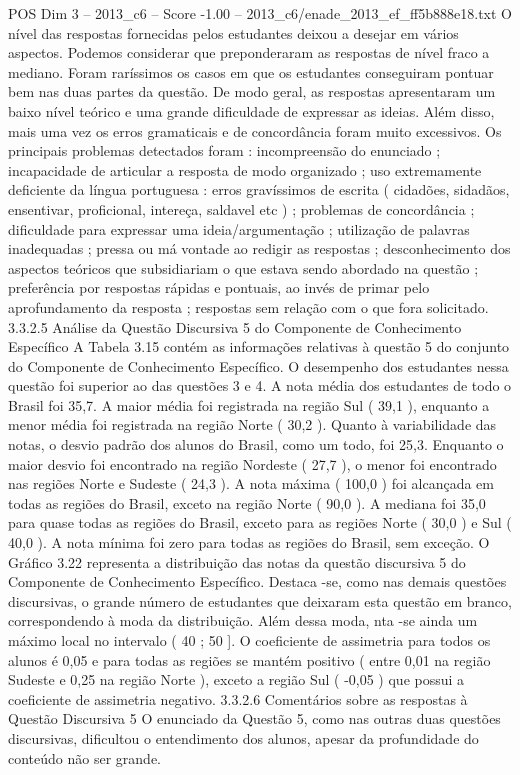 \begin{textsample}{POS Dim 3 – 2013\_c6 – Score -1.00 – 2013\_c6/enade\_2013\_ef\_ff5b888e18.txt}
O nível das respostas fornecidas pelos estudantes deixou a desejar em vários aspectos.
Podemos considerar que preponderaram as respostas de nível fraco a mediano.
Foram raríssimos os casos em que os estudantes conseguiram pontuar bem nas duas partes da questão.
De modo geral, as respostas apresentaram um baixo nível teórico e uma grande dificuldade de expressar as ideias.
Além disso, mais uma vez os erros gramaticais e de concordância foram muito excessivos.
Os principais problemas detectados foram : incompreensão do enunciado ; incapacidade de articular a resposta de modo organizado ; uso extremamente deficiente da língua portuguesa : erros gravíssimos de escrita ( cidadões, sidadãos, ensentivar, proficional, intereça, saldavel etc ) ; problemas de concordância ; dificuldade para expressar uma ideia/argumentação ; utilização de palavras inadequadas ; pressa ou má vontade ao redigir as respostas ; desconhecimento dos aspectos teóricos que subsidiariam o que estava sendo abordado na questão ; preferência por respostas rápidas e pontuais, ao invés de primar pelo aprofundamento da resposta ; respostas sem relação com o que fora solicitado. 3.3.2.5 Análise da Questão Discursiva 5 do Componente de Conhecimento Específico A Tabela 3.15 contém as informações relativas à questão 5 do conjunto do Componente de Conhecimento Específico.
O desempenho dos estudantes nessa questão foi superior ao das questões 3 e 4.
A nota média dos estudantes de todo o Brasil foi 35,7.
A maior média foi registrada na região Sul ( 39,1 ), enquanto a menor média foi registrada na região Norte ( 30,2 ).
Quanto à variabilidade das notas, o desvio padrão dos alunos do Brasil, como um todo, foi 25,3.
Enquanto o maior desvio foi encontrado na região Nordeste ( 27,7 ), o menor foi encontrado nas regiões Norte e Sudeste ( 24,3 ).
A nota máxima ( 100,0 ) foi alcançada em todas as regiões do Brasil, exceto na região Norte ( 90,0 ).
A mediana foi 35,0 para quase todas as regiões do Brasil, exceto para as regiões Norte ( 30,0 ) e Sul ( 40,0 ).
A nota mínima foi zero para todas as regiões do Brasil, sem exceção.
O Gráfico 3.22 representa a distribuição das notas da questão discursiva 5 do Componente de Conhecimento Específico.
Destaca -se, como nas demais questões discursivas, o grande número de estudantes que deixaram esta questão em branco, correspondendo à moda da distribuição.
Além dessa moda, nta -se ainda um máximo local no intervalo ( 40 ; 50 ].
O coeficiente de assimetria para todos os alunos é 0,05 e para todas as regiões se mantém positivo ( entre 0,01 na região Sudeste e 0,25 na região Norte ), exceto a região Sul ( -0,05 ) que possui a coeficiente de assimetria negativo. 3.3.2.6 Comentários sobre as respostas à Questão Discursiva 5 O enunciado da Questão 5, como nas outras duas questões discursivas, dificultou o entendimento dos alunos, apesar da profundidade do conteúdo não ser grande.

\end{textsample}
